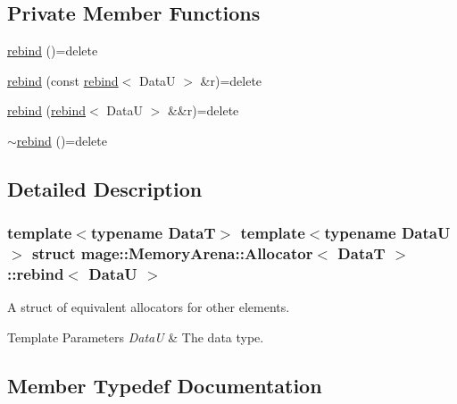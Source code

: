 \subsection*{Private Member Functions}
\begin{DoxyCompactItemize}
\item 
\hyperlink{structmage_1_1_memory_arena_1_1_allocator_1_1rebind_accff2c1aafa45e3c5cc9f5d66b4a3bb5}{rebind} ()=delete
\item 
\hyperlink{structmage_1_1_memory_arena_1_1_allocator_1_1rebind_ad77d68305f2e8f5ddd4080e6f992efec}{rebind} (const \hyperlink{structmage_1_1_memory_arena_1_1_allocator_1_1rebind}{rebind}$<$ DataU $>$ \&r)=delete
\item 
\hyperlink{structmage_1_1_memory_arena_1_1_allocator_1_1rebind_ad5ffaeaa7cb232ecab88501d9913f9b7}{rebind} (\hyperlink{structmage_1_1_memory_arena_1_1_allocator_1_1rebind}{rebind}$<$ DataU $>$ \&\&r)=delete
\item 
\hyperlink{structmage_1_1_memory_arena_1_1_allocator_1_1rebind_aa16db3ef40f7564d9079ee615239bda5}{$\sim$rebind} ()=delete
\end{DoxyCompactItemize}


\subsection{Detailed Description}
\subsubsection*{template$<$typename DataT$>$\newline
template$<$typename DataU$>$\newline
struct mage\+::\+Memory\+Arena\+::\+Allocator$<$ Data\+T $>$\+::rebind$<$ Data\+U $>$}

A struct of equivalent allocators for other elements.


\begin{DoxyTemplParams}{Template Parameters}
{\em DataU} & The data type. \\
\hline
\end{DoxyTemplParams}


\subsection{Member Typedef Documentation}
\hypertarget{structmage_1_1_memory_arena_1_1_allocator_1_1rebind_aad55bf384b9a95ae1c2158f1d2afe180}{}\label{structmage_1_1_memory_arena_1_1_allocator_1_1rebind_aad55bf384b9a95ae1c2158f1d2afe180} 
